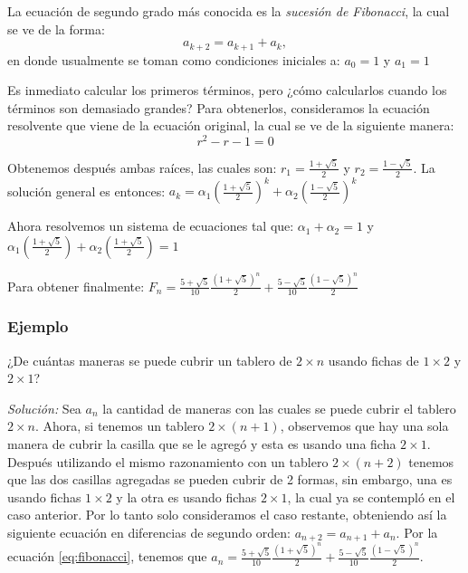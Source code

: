 \documentclass{article}
\begin{document}
La ecuación de segundo grado más conocida es la \textit{sucesión de
  Fibonacci}, la cual se ve de la forma:
\begin{equation}
  \label{eq:fibonacci}
a_{k+2}=a_{k+1}+a_{k},  
\end{equation}
en donde usualmente se toman como condiciones iniciales a: $a_{0}=1$ y $a_{1}=1$

Es inmediato calcular los primeros términos, pero ¿cómo calcularlos
cuando los términos son demasiado grandes?  Para obtenerlos,
consideramos la ecuación resolvente que viene de la ecuación original,
la cual se ve de la siguiente manera:
$$r^2-r-1=0$$

Obtenemos después ambas raíces, las cuales son:
$r_{1}= \frac{1+\sqrt{5}}{2}$ y $r_{2}=\frac{1-\sqrt{5}}{2}$. La
solución general es entonces:
$a_{k}=\alpha_{1}(\frac{1+\sqrt{5}}{2})^{k} +
\alpha_{2}(\frac{1-\sqrt{5}}{2})^k$

Ahora resolvemos un sistema de ecuaciones tal que:
$\alpha_{1} + \alpha_{2}= 1$ y
$\alpha_{1}(\frac{1+\sqrt{5}}{2}) + \alpha_{2}(\frac{1+\sqrt{5}}{2})=1$

Para obtener finalmente:
$F_{n}= \frac{5+\sqrt{5}}{10}\frac{(1+\sqrt{5})^n}{2} +
\frac{5-\sqrt{5}}{10}\frac{(1-\sqrt{5})^n}{2}$

\subsubsection{Ejemplo}
\label{sec:fichas}

¿De cuántas maneras se puede cubrir un tablero de $2\times n$ usando
fichas de $1\times 2$ y $2\times 1$?

\textit{Solución:} Sea $a_n$ la cantidad de maneras con las cuales se
puede cubrir el tablero $2\times n$. Ahora, si tenemos un tablero
$2\times (n+1)$, observemos que hay una sola manera de cubrir la
casilla que se le agregó y esta es usando una ficha $2\times 1$.
Después utilizando el mismo razonamiento con un tablero
$2\times (n+2)$ tenemos que las dos casillas agregadas se pueden
cubrir de 2 formas, sin embargo, una es usando fichas $1\times 2$ y la
otra es usando fichas $2\times 1$, la cual ya se contempló en el caso
anterior. Por lo tanto solo consideramos el caso restante, obteniendo
así la siguiente ecuación en diferencias de segundo orden:
$a_{n+2}=a_{n+1}+a_n$.  Por la ecuación \eqref{eq:fibonacci}, tenemos
que
$a_n=\frac{5+\sqrt{5}}{10}\frac{(1+\sqrt{5})^n}{2} +
\frac{5-\sqrt{5}}{10}\frac{(1-\sqrt{5})^n}{2}$.


\end{document}
